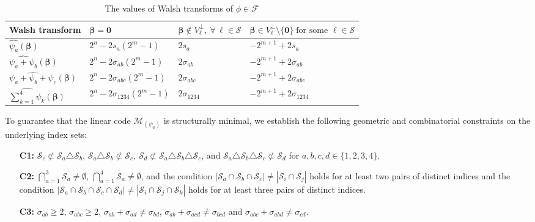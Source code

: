 \documentclass[pdflatex,sn-mathphys-num]{sn-jnl}%
\theoremstyle{thmstyleone}%
\theoremstyle{thmstyletwo}%
\theoremstyle{thmstylethree}%
\begin{document}
\begin{table}[ht]
\centering
\caption{The values of Walsh transforms of $\phi \in \mathcal{F}$}
\label{Table_1}
\label{tab:walsh}
\renewcommand{\arraystretch}{1.0}
\begin{tabular}{|l|l|l|l|}
\hline
Walsh transform &
$\mathbf{\beta=0}$ &
$\mathbf{\beta} \notin V_\ell^\perp,\ \forall\, \ell \in \mathcal{S}$ &
$\mathbf{\beta}\in V_\ell^\perp\setminus\{\mathbf{0}\}\; \text{for some }\ell \in \mathcal{S}$ \\
\hline
$\widehat{\psi_a}(\mathbf{\beta})$ &
$2^n-2s_a(2^m-1)$ &
$2s_a$ &
$-2^{m+1}+2s_a$
\\
\hline
$\widehat{\psi_a+\psi_b}(\mathbf{\beta})$ &
$2^n-2\sigma_{ab}(2^m-1)$ &
$2\sigma_{ab}$ &
$-2^{m+1}+2\sigma_{ab}$
\\
\hline
$\widehat{\psi_a+\psi_b+\psi_c}(\mathbf{\beta})$ &
$2^n-2\sigma_{abc}(2^m-1)$ &
$2\sigma_{abc}$ &
$-2^{m+1}+2\sigma_{abc}$
\\
\hline
$\widehat{\displaystyle\sum_{k=1}^{4}\psi_k}(\mathbf{\beta})$ &
$2^n-2\sigma_{1234}(2^m-1)$ &
$2\sigma_{1234}$ &
$-2^{m+1}+2\sigma_{1234}$
\\
\hline
\end{tabular}
\end{table}

To guarantee that the linear code $\mathcal{M}_{(\psi_a)}$ is structurally minimal, we establish the following geometric and combinatorial constraints on the underlying index sets:

\begin{itemize}
    \item[\textbf{C1:}] $\mathcal{S}_c \not\subset \mathcal{S}_a \triangle \mathcal{S}_b$, $\mathcal{S}_a \triangle \mathcal{S}_b \not\subset \mathcal{S}_c$, $\mathcal{S}_d \not\subset \mathcal{S}_a \triangle \mathcal{S}_b \triangle \mathcal{S}_c$, and $\mathcal{S}_a \triangle \mathcal{S}_b \triangle \mathcal{S}_c \not\subset \mathcal{S}_d$ for  $a,b,c,d \in \{1,2,3,4\}$.
    \item[\textbf{C2:}] $\bigcap_{a=1}^3 \mathcal{S}_a \neq \emptyset$, $\bigcap_{a=1}^{4} \mathcal{S}_a \neq \emptyset$, and the condition $|\mathcal{S}_a \cap \mathcal{S}_b \cap \mathcal{S}_c| \neq |\mathcal{S}_i \cap \mathcal{S}_j|$ holds for at least two pairs of distinct indices and the condition $|\mathcal{S}_a \cap \mathcal{S}_b \cap \mathcal{S}_c \cap \mathcal{S}_d| \neq |\mathcal{S}_i \cap \mathcal{S}_j \cap \mathcal{S}_k|$ holds for at least three pairs of distinct indices.
    \item[\textbf{C3:}] $\sigma_{ab} \geq 2$, $\sigma_{abc} \geq 2$, $\sigma_{ab} + \sigma_{ad} \neq \sigma_{bd}$, $\sigma_{ab} + \sigma_{acd} \neq \sigma_{bcd}$ and $\sigma_{abc} + \sigma_{abd} \neq \sigma_{cd}$.
\end{itemize}
\end{document}

